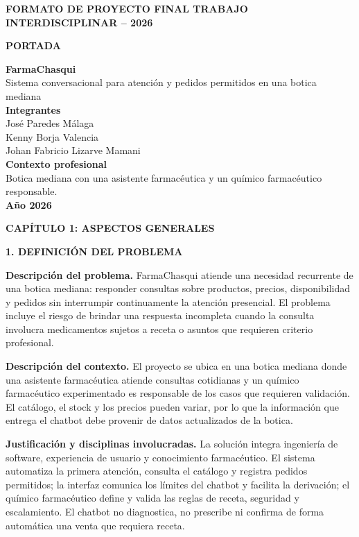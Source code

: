 \documentclass[11pt,a4paper]{article}
\newcommand{\capitulo}[1]{\vspace{1.2em}\noindent\textbf{\large #1}\par\vspace{0.45em}}
\newcommand{\apartado}[1]{\vspace{0.8em}\noindent\textbf{#1}\par\vspace{0.25em}}
\begin{document}
\begin{center}
\textbf{FORMATO DE PROYECTO FINAL TRABAJO INTERDISCIPLINAR -- 2026}
\end{center}

\vspace{1.8cm}
\begin{center}
\textbf{PORTADA}

\vspace{1.4cm}
{\Large\textbf{FarmaChasqui}}\\[0.5cm]
{\large Sistema conversacional para atención y pedidos permitidos en una botica mediana}\\[1.5cm]

\textbf{Integrantes}\\[0.2cm]
José Paredes Málaga\\
Kenny Borja Valencia\\
Johan Fabricio Lizarve Mamani\\[1cm]

\textbf{Contexto profesional}\\[0.2cm]
Botica mediana con una asistente farmacéutica y un químico farmacéutico responsable.\\[1cm]

\textbf{Año 2026}
\end{center}

\newpage

\capitulo{CAPÍTULO 1: ASPECTOS GENERALES}

\apartado{1. DEFINICIÓN DEL PROBLEMA}

\textbf{Descripción del problema.} FarmaChasqui atiende una necesidad recurrente de una botica mediana: responder consultas sobre productos, precios, disponibilidad y pedidos sin interrumpir continuamente la atención presencial. El problema incluye el riesgo de brindar una respuesta incompleta cuando la consulta involucra medicamentos sujetos a receta o asuntos que requieren criterio profesional.

\textbf{Descripción del contexto.} El proyecto se ubica en una botica mediana donde una asistente farmacéutica atiende consultas cotidianas y un químico farmacéutico experimentado es responsable de los casos que requieren validación. El catálogo, el stock y los precios pueden variar, por lo que la información que entrega el chatbot debe provenir de datos actualizados de la botica.

\textbf{Justificación y disciplinas involucradas.} La solución integra ingeniería de software, experiencia de usuario y conocimiento farmacéutico. El sistema automatiza la primera atención, consulta el catálogo y registra pedidos permitidos; la interfaz comunica los límites del chatbot y facilita la derivación; el químico farmacéutico define y valida las reglas de receta, seguridad y escalamiento. El chatbot no diagnostica, no prescribe ni confirma de forma automática una venta que requiera receta.
\end{document}

